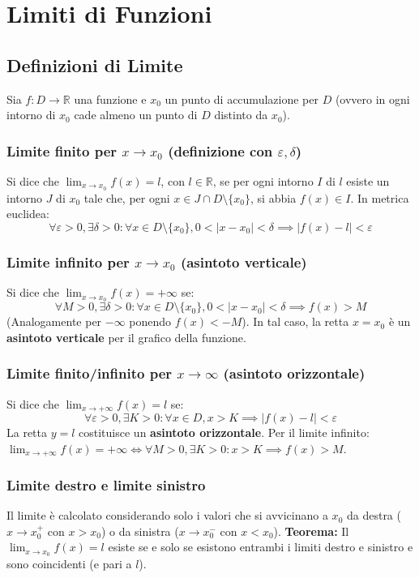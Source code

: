 \section{Limiti di Funzioni}
\subsection{Definizioni di Limite}
Sia $f: D \to \mathbb{R}$ una funzione e $x_0$ un punto di accumulazione per $D$ (ovvero in ogni intorno di $x_0$ cade almeno un punto di $D$ distinto da $x_0$).
\subsubsection{Limite finito per $x \to x_0$ (definizione con $\varepsilon, \delta$)}
Si dice che $\lim_{x \to x_0} f(x) = l$, con $l \in \mathbb{R}$, se per ogni intorno $I$ di $l$ esiste un intorno $J$ di $x_0$ tale che, per ogni $x \in J \cap D \setminus \{x_0\}$, si abbia $f(x) \in I$. In metrica euclidea:
\[ \forall \varepsilon > 0, \exists \delta > 0 : \forall x \in D \setminus \{x_0\}, 0 < |x - x_0| < \delta \implies |f(x) - l| < \varepsilon \]

\subsubsection{Limite infinito per $x \to x_0$ (asintoto verticale)}
Si dice che $\lim_{x \to x_0} f(x) = +\infty$ se:
\[ \forall M > 0, \exists \delta > 0 : \forall x \in D \setminus \{x_0\}, 0 < |x - x_0| < \delta \implies f(x) > M \]
(Analogamente per $-\infty$ ponendo $f(x) < -M$). In tal caso, la retta $x = x_0$ è un \textbf{asintoto verticale} per il grafico della funzione.

\subsubsection{Limite finito/infinito per $x \to \infty$ (asintoto orizzontale)}
Si dice che $\lim_{x \to +\infty} f(x) = l$ se:
\[ \forall \varepsilon > 0, \exists K > 0 : \forall x \in D, x > K \implies |f(x) - l| < \varepsilon \]
La retta $y = l$ costituisce un \textbf{asintoto orizzontale}.
Per il limite infinito: $\lim_{x \to +\infty} f(x) = +\infty \iff \forall M > 0, \exists K > 0 : x > K \implies f(x) > M$.

\subsubsection{Limite destro e limite sinistro}
Il limite è calcolato considerando solo i valori che si avvicinano a $x_0$ da destra ($x \to x_0^+$ con $x > x_0$) o da sinistra ($x \to x_0^-$ con $x < x_0$).
\textbf{Teorema:} Il $\lim_{x \to x_0} f(x) = l$ esiste se e solo se esistono entrambi i limiti destro e sinistro e sono coincidenti (e pari a $l$).

